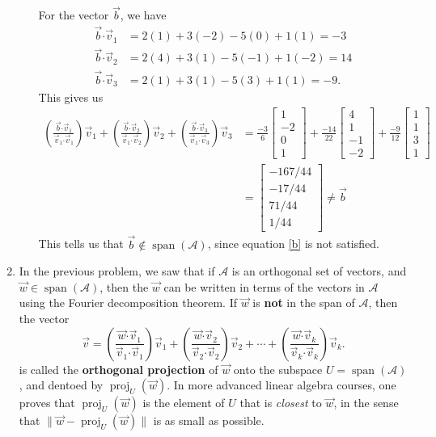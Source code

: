\documentclass[letterpaper,12pt]{article}
\newcommand{\len}[1]{\lVert #1\rVert}
\newcommand{\dotp}{\boldsymbol{\cdot}}
\newcommand{\bbm}{\begin{bmatrix}}
\newcommand{\ebm}{\end{bmatrix}}
\DeclareMathOperator{\proj}{proj}
\begin{document}
\begin{enumerate}
\begin{enumerate}
For the vector $\vec{b}$, we have
\begin{align*}
 \vec{b}\dotp \vec{v}_1 & = 2(1)+3(-2)-5(0)+1(1) = -3\\
 \vec{b}\dotp \vec{v}_2 & = 2(4)+3(1)-5(-1)+1(-2) = 14\\
 \vec{b}\dotp \vec{v}_3 & = 2(1)+3(1)-5(3)+1(1) = -9.
\end{align*}
This gives us
\begin{align*}
 \left(\frac{\vec{b}\dotp \vec{v}_1}{\vec{v}_1\dotp\vec{v}_1}\right)\vec{v}_1+
 \left(\frac{\vec{b}\dotp \vec{v}_2}{\vec{v}_1\dotp\vec{v}_2}\right)\vec{v}_2+
 \left(\frac{\vec{b}\dotp \vec{v}_3}{\vec{v}_1\dotp\vec{v}_3}\right)\vec{v}_3 & = \frac{-3}{6}\bbm 1\\-2\\0\\1\ebm + \frac{-14}{22}\bbm 4\\1\\-1\\-2\ebm + \frac{-9}{12}\bbm 1\\1\\3\\1\ebm\\
 & = \bbm -167/44\\-17/44\\71/44\\1/44\ebm \neq \vec{b}
\end{align*}
This tells us that $\vec{b}\notin \operatorname{span}(\mathcal{A})$, since equation \eqref{b} is not satisfied.
\end{enumerate}

\bigskip

\item In the previous problem, we saw that if $\mathcal{A}$ is an orthogonal set of vectors, and $\vec{w}\in\operatorname{span}(\mathcal{A})$, then the $\vec{w}$ can be written in terms of the vectors in $\mathcal{A}$ using the Fourier decomposition theorem. If $\vec{w}$ is \textbf{not} in the span of $\mathcal{A}$, then the vector
\begin{equation}\label{c}
 \vec{v}=\left(\frac{\vec{w}\dotp\vec{v}_1}{\vec{v}_1\dotp \vec{v}_1}\right)\vec{v}_1 + \left(\frac{\vec{w}\dotp\vec{v}_2}{\vec{v}_2\dotp\vec{v}_2}\right)\vec{v}_2+\cdots + \left(\frac{\vec{w}\dotp\vec{v}_k}{\vec{v}_k\dotp\vec{v}_k}\right)\vec{v}_k.
\end{equation}
is called the \textbf{orthogonal projection} of $\vec{w}$ onto the subspace $U=\operatorname{span}(\mathcal{A})$, and dentoed by $\proj_U(\vec{w})$. In more advanced linear algebra courses, one proves that $\proj_U(\vec{w})$ is the element of $U$ that is \textit{closest} to $\vec{w}$, in the sense that $\len{\vec{w}-\proj_U(\vec{w})}$ is as small as possible.


\end{enumerate}
\end{document}
